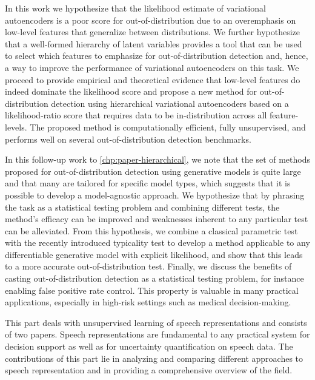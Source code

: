In this work we hypothesize that the likelihood estimate of variational autoencoders is a poor score for out-of-distribution due to an overemphasis on low-level features that generalize between distributions. 
We further hypothesize that a well-formed hierarchy of latent variables provides a tool that can be used to select which features to emphasize for out-of-distribution detection and, hence, a way to improve the performance of variational autoencoders on this task. 
We proceed to provide empirical and theoretical evidence that low-level features do indeed dominate the likelihood score and propose a new method for out-of-distribution detection using hierarchical variational autoencoders based on a likelihood-ratio score that requires data to be in-distribution across all feature-levels. 
The proposed method is computationally efficient, fully unsupervised, and performs well on several out-of-distribution detection benchmarks. 

In this follow-up work to \cref{chp:paper-hierarchical}, we note that the set of methods proposed for out-of-distribution detection using generative models is quite large and that many are tailored for specific model types, which suggests that it is possible to develop a model-agnostic approach. We hypothesize that by phrasing the task as a statistical testing problem and combining different tests, the method's efficacy can be improved and weaknesses inherent to any particular test can be alleviated. 
From this hypothesis, we combine a classical parametric test with the recently introduced typicality test to develop a method applicable to any differentiable  generative model with explicit likelihood, and show that this leads to a more accurate out-of-distribution test. 
Finally, we discuss the benefits of casting out-of-distribution detection as a statistical testing problem, for instance enabling false positive rate control. This property is valuable in many practical applications, especially in high-risk settings such as medical decision-making.


This part deals with unsupervised learning of speech representations and consists of two papers. Speech representations are fundamental to any practical system for decision support as well as for uncertainty quantification on speech data. 
The contributions of this part lie in analyzing and comparing different approaches to speech representation and in providing a comprehensive overview of the field.

